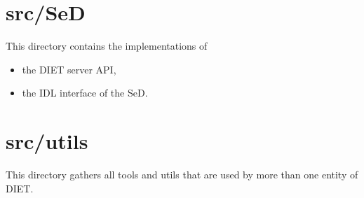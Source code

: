 

\section{\textsf{src/SeD}}
\label{s:SeD}

This directory contains the implementations of
\begin{itemize}
\item the DIET server API,
\item the IDL interface of the SeD.
\end{itemize}



\section{\textsf{src/utils}}
\label{s:utils}

This directory gathers all tools and utils that are used by more than one entity
of DIET.

